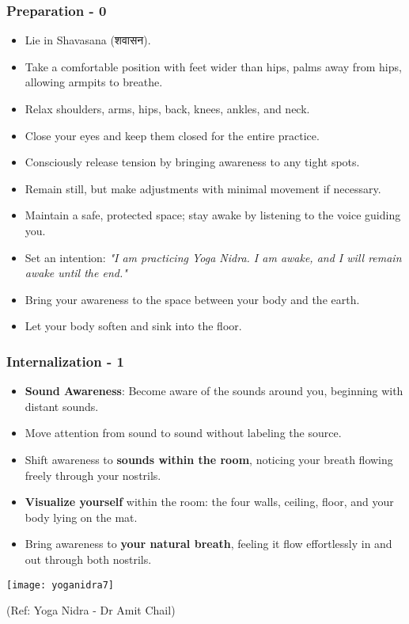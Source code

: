 \begin{frame}[fragile]\frametitle{Preparation - 0}
    \begin{itemize}
        \item Lie in Shavasana (शवासन).
        \item Take a comfortable position with feet wider than hips, palms away from hips, allowing armpits to breathe.
        \item Relax shoulders, arms, hips, back, knees, ankles, and neck.
        \item Close your eyes and keep them closed for the entire practice.
        \item Consciously release tension by bringing awareness to any tight spots.
        \item Remain still, but make adjustments with minimal movement if necessary.
        \item Maintain a safe, protected space; stay awake by listening to the voice guiding you.
        \item Set an intention: \textit{"I am practicing Yoga Nidra. I am awake, and I will remain awake until the end."}
        \item Bring your awareness to the space between your body and the earth.
        \item Let your body soften and sink into the floor.    
	\end{itemize}
	
\end{frame}

\begin{frame}[fragile]\frametitle{Internalization - 1}
    \begin{itemize}
        \item \textbf{Sound Awareness}: Become aware of the sounds around you, beginning with distant sounds. 
        \item Move attention from sound to sound without labeling the source.
        \item Shift awareness to \textbf{sounds within the room}, noticing your breath flowing freely through your nostrils.
        \item \textbf{Visualize yourself} within the room: the four walls, ceiling, floor, and your body lying on the mat.
        \item Bring awareness to \textbf{your natural breath}, feeling it flow effortlessly in and out through both nostrils.
    \end{itemize}
	
      \begin{center}
        \texttt{[image: yoganidra7]}

		{\tiny (Ref: Yoga Nidra - Dr Amit Chail)}		
        \end{center}		
\end{frame}


